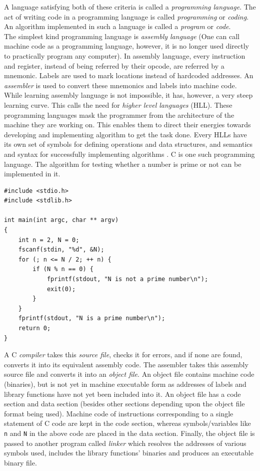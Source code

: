 A language satisfying both of these criteria is called a \textit{programming language}. The act of writing code in a programming language is called \textit{programming} or \textit{coding}. An algorithm implemented in such a language is called a \textit{program} or \textit{code}.\\
The simplest kind programming language is \textit{assembly language} (One can call machine code as a programming language, however, it is no longer used directly to practically program any computer). In assembly language, every instruction and register, instead of being referred by their opcode, are referred by a mnemonic. Labels are used to mark locations instead of hardcoded addresses. An \textit{assembler} is used to convert these mnemonics and labels into machine code.\\
While learning assembly language is not impossible, it has, however, a very steep learning curve. This calls the need for \textit{higher level languages} (HLL). These programming languages mask the programmer from the architecture of the machine they are working on. This enables them to direct their energies towards developing and implementing algorithm to get the task done. Every HLLs have its own set of symbols for defining operations and data structures, and semantics and syntax for successfully implementing algorithms \cite{hthreads2006glossary}\cite{chu1975concepts}. C is one such programming language. The algorithm for testing whether a number is prime or not can be implemented in it.
\begin{Verbatim}[tabsize=8]
#include <stdio.h>
#include <stdlib.h>

int main(int argc, char ** argv)
{
	int n = 2, N = 0;
	fscanf(stdin, "%d", &N);
	for (; n <= N / 2; ++ n) {
		if (N % n == 0) {
			fprintf(stdout, "N is not a prime number\n");
			exit(0);
		}
	}
	fprintf(stdout, "N is a prime number\n");
	return 0;
}
\end{Verbatim}
A C \textit{compiler} takes this \textit{source file}, checks it for errors, and if none are found, converts it into its equivalent assembly code. The assembler takes this assembly source file and converts it into an \textit{object file}. An object file contains machine code (binaries), but is not yet in machine executable form as addresses of labels and library functions have not yet been included into it. An object file has a code section and data section (besides other sections depending upon the object file format being used). Machine code of instructions corresponding to a single statement of C code are kept in the code section, whereas symbols/variables like \verb|n| and \verb|N| in the above code are placed in the data section. Finally, the object file is passed to another program called \textit{linker} which resolves the addresses of various symbols used, includes the library functions' binaries and produces an executable binary file.\\ 

